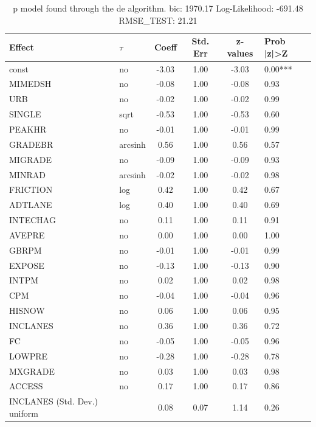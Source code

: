 \begin{table}
	\caption{p model found through the de algorithm. bic: 1970.17 Log-Likelihood: -691.48 RMSE_TEST: 21.21}
	\begin{center}
		\begin{tabular}{|l|l|c|c|c|l|}
			\hline
			Effect & $\tau$ & Coeff & Std. Err & z-values & Prob |z|>Z \\
			\hline
			const & no & -3.03 & 1.00 & -3.03 & 0.00*** \\
			\hline
			MIMEDSH & no & -0.08 & 1.00 & -0.08 & 0.93 \\
			\hline
			URB & no & -0.02 & 1.00 & -0.02 & 0.99 \\
			\hline
			SINGLE & sqrt & -0.53 & 1.00 & -0.53 & 0.60 \\
			\hline
			PEAKHR & no & -0.01 & 1.00 & -0.01 & 0.99 \\
			\hline
			GRADEBR & arcsinh & 0.56 & 1.00 & 0.56 & 0.57 \\
			\hline
			MIGRADE & no & -0.09 & 1.00 & -0.09 & 0.93 \\
			\hline
			MINRAD & arcsinh & -0.02 & 1.00 & -0.02 & 0.98 \\
			\hline
			FRICTION & log & 0.42 & 1.00 & 0.42 & 0.67 \\
			\hline
			ADTLANE & log & 0.40 & 1.00 & 0.40 & 0.69 \\
			\hline
			INTECHAG & no & 0.11 & 1.00 & 0.11 & 0.91 \\
			\hline
			AVEPRE & no & 0.00 & 1.00 & 0.00 & 1.00 \\
			\hline
			GBRPM & no & -0.01 & 1.00 & -0.01 & 0.99 \\
			\hline
			EXPOSE & no & -0.13 & 1.00 & -0.13 & 0.90 \\
			\hline
			INTPM & no & 0.02 & 1.00 & 0.02 & 0.98 \\
			\hline
			CPM & no & -0.04 & 1.00 & -0.04 & 0.96 \\
			\hline
			HISNOW & no & 0.06 & 1.00 & 0.06 & 0.95 \\
			\hline
			INCLANES & no & 0.36 & 1.00 & 0.36 & 0.72 \\
			\hline
			FC & no & -0.05 & 1.00 & -0.05 & 0.96 \\
			\hline
			LOWPRE & no & -0.28 & 1.00 & -0.28 & 0.78 \\
			\hline
			MXGRADE & no & 0.03 & 1.00 & 0.03 & 0.98 \\
			\hline
			ACCESS & no & 0.17 & 1.00 & 0.17 & 0.86 \\
			\hline
			INCLANES (Std. Dev.) uniform &  & 0.08 & 0.07 & 1.14 & 0.26 \\

\end{tabular}
\end{center}
\end{table}
